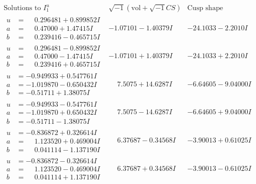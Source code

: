 \documentclass[1p]{elsarticle_modified}
\theoremstyle{definition}
\newcommand{\I}{\sqrt{-1}}
\begin{document}
$$\begin{array}{c|c|c}  
\text{Solutions to }I^u_{1}& \I (\text{vol} + \sqrt{-1}CS) & \text{Cusp shape}\\
 \hline 
\begin{aligned}
u &= \phantom{-}0.296481 + 0.899852 I \\
a &= \phantom{-}0.47000 + 1.47415 I \\
b &= \phantom{-}0.239416 - 0.465715 I\end{aligned}
 & -1.07101 - 1.40379 I & -24.1033 - 2.2010 I \\ \hline\begin{aligned}
u &= \phantom{-}0.296481 - 0.899852 I \\
a &= \phantom{-}0.47000 - 1.47415 I \\
b &= \phantom{-}0.239416 + 0.465715 I\end{aligned}
 & -1.07101 + 1.40379 I & -24.1033 + 2.2010 I \\ \hline\begin{aligned}
u &= -0.949933 + 0.547761 I \\
a &= -1.019870 - 0.650432 I \\
b &= -0.51711 + 1.38075 I\end{aligned}
 & \phantom{-}7.5075 + 14.6287 I & -6.64605 - 9.04000 I \\ \hline\begin{aligned}
u &= -0.949933 - 0.547761 I \\
a &= -1.019870 + 0.650432 I \\
b &= -0.51711 - 1.38075 I\end{aligned}
 & \phantom{-}7.5075 - 14.6287 I & -6.64605 + 9.04000 I \\ \hline\begin{aligned}
u &= -0.836872 + 0.326614 I \\
a &= \phantom{-}1.123520 + 0.469004 I \\
b &= \phantom{-}0.041114 - 1.137190 I\end{aligned}
 & \phantom{-}6.37687 - 0.34568 I & -3.90013 + 0.61025 I \\ \hline\begin{aligned}
u &= -0.836872 - 0.326614 I \\
a &= \phantom{-}1.123520 - 0.469004 I \\
b &= \phantom{-}0.041114 + 1.137190 I\end{aligned}
 & \phantom{-}6.37687 + 0.34568 I & -3.90013 - 0.61025 I \\ \hline\begin{aligned}

\end{aligned}
\end{array}$$
\end{document}
